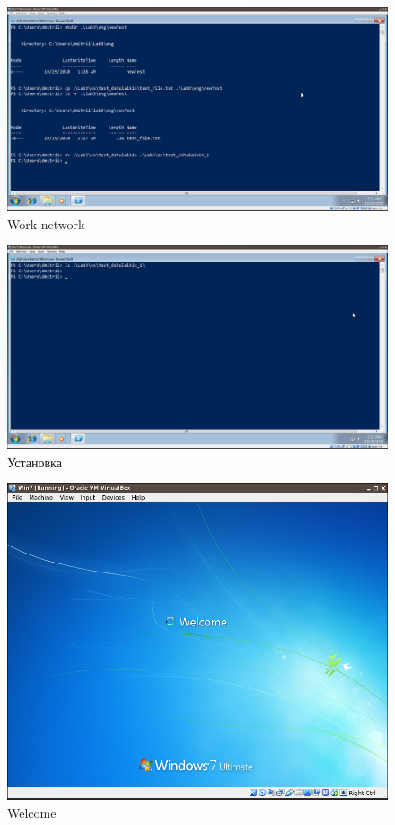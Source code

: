 \documentclass[a4paper]{article}
\begin{document}
\begin{figure}[H]
    \centering
    \includegraphics[width=\linewidth]{27.png}
    \caption{Work network}
\end{figure}


\begin{figure}[H]
    \centering
    \includegraphics[width=\linewidth]{28.png}
    \caption{Установка}
\end{figure}


\begin{figure}[H]
    \centering
    \includegraphics[width=\linewidth]{29.png}
    \caption{Welcome}
\end{figure}
\end{document}
